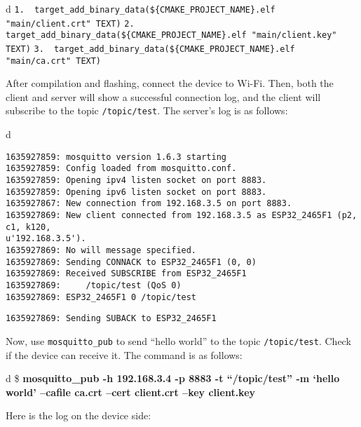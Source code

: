 \documentclass[a4paper,12pt]{book}
\begin{document}
\begin{codebloc}
\begin{tabular}{d}
\verb|1.  target_add_binary_data(${CMAKE_PROJECT_NAME}.elf "main/client.crt" TEXT)|\newline
\verb|2.  target_add_binary_data(${CMAKE_PROJECT_NAME}.elf "main/client.key" TEXT)|\newline
\verb|3.  target_add_binary_data(${CMAKE_PROJECT_NAME}.elf "main/ca.crt" TEXT)|
\end{tabular}
\end{codebloc}

After compilation and flashing, connect the device to Wi-Fi. Then, both the client and server will show a successful connection log, and the client will subscribe to the topic \verb|/topic/test|. The server’s log is as follows:

\begin{codebloc}
\begin{tabular}{d}
\vspace{2pt}
\begin{verbatim}
1635927859: mosquitto version 1.6.3 starting
1635927859: Config loaded from mosquitto.conf.
1635927859: Opening ipv4 listen socket on port 8883.
1635927859: Opening ipv6 listen socket on port 8883.
1635927867: New connection from 192.168.3.5 on port 8883.
1635927869: New client connected from 192.168.3.5 as ESP32_2465F1 (p2, c1, k120, 
u'192.168.3.5').
1635927869: No will message specified.
1635927869: Sending CONNACK to ESP32_2465F1 (0, 0)
1635927869: Received SUBSCRIBE from ESP32_2465F1
1635927869:     /topic/test (QoS 0)
1635927869: ESP32_2465F1 0 /topic/test
\end{verbatim}
\verb|1635927869: Sending SUBACK to ESP32_2465F1|
\end{tabular}
\end{codebloc}

Now, use \verb|mosquitto_pub| to send “hello world” to the topic \verb|/topic/test|. Check if the device can receive it. The command is as follows:

\begin{codebloc}
\begin{tabular}{d}
\$ \textbf{mosquitto\_pub -h 192.168.3.4 -p 8883 -t “/topic/test” -m ‘hello world’ --cafile ca.crt --cert client.crt --key client.key}
\end{tabular}
\end{codebloc}

Here is the log on the device side:
\end{document}
